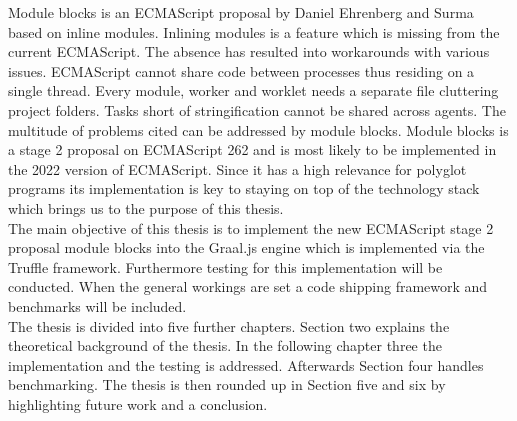 Module blocks is an ECMAScript proposal by Daniel Ehrenberg and Surma based on inline modules. Inlining modules is a feature which is missing from the current ECMAScript. The absence has resulted into workarounds with various issues. ECMAScript cannot share code between processes thus residing on a single thread. Every module, worker and worklet needs a separate file cluttering project folders. Tasks short of stringification cannot be shared across agents. The multitude of problems cited can be addressed by module blocks. Module blocks is a stage 2 proposal on ECMAScript 262 and is most likely to be implemented in the 2022 version of ECMAScript. Since it has a high relevance for polyglot programs its implementation is key to staying on top of the technology stack which brings us to the purpose of this thesis.\\
The main objective of this thesis is to implement the new ECMAScript stage 2 proposal module blocks into the Graal.js engine which is implemented via the Truffle framework. Furthermore testing for this implementation will be conducted. When the general workings are set a code shipping framework and benchmarks will be included.\\
The thesis is divided into five further chapters. Section two explains the theoretical background of the thesis. In the following chapter three the implementation and the testing is addressed. Afterwards Section four handles benchmarking. The thesis is then rounded up in Section five and six by highlighting future work and a conclusion.




